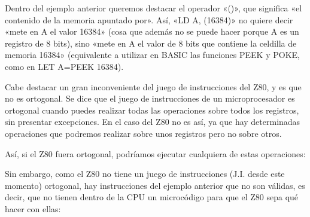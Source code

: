 \documentclass[letterpaper,10pt,spanish]{sphinxmanual}
\begin{document}
Dentro del ejemplo anterior queremos destacar el operador «()», que significa «el contenido de la memoria apuntado por». Así, «LD A, (16384)» no quiere decir «mete en A el valor 16384» (cosa que además no se puede hacer porque A es un registro de 8 bits), sino «mete en A el valor de 8 bits que contiene la celdilla de memoria 16384» (equivalente a utilizar en BASIC las funciones PEEK y POKE, como en LET A=PEEK 16384).

Cabe destacar un gran inconveniente del juego de instrucciones del Z80, y es que no es ortogonal. Se dice que el juego de instrucciones de un microprocesador es ortogonal cuando puedes realizar todas las operaciones sobre todos los registros, sin presentar excepciones. En el caso del Z80 no es así, ya que hay determinadas operaciones que podremos realizar sobre unos registros pero no sobre otros.

Así, si el Z80 fuera ortogonal, podríamos ejecutar cualquiera de estas operaciones:

\begin{sphinxVerbatim}[commandchars=\\\{\}]
  
  
  
  
  
  
  
\end{sphinxVerbatim}

Sin embargo, como el Z80 no tiene un juego de instrucciones (J.I. desde este momento) ortogonal, hay instrucciones del ejemplo anterior que no son válidas, es decir, que no tienen dentro de la CPU un microcódigo para que el Z80 sepa qué hacer con ellas:
\end{document}
